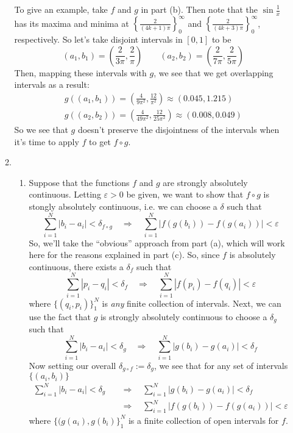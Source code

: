 \documentclass[12pt]{article}
\theoremstyle{plain}
\theoremstyle{definition}
\theoremstyle{remark}
\begin{document}
\begin{enumerate}
\begin{enumerate}
To give an example, take $f$ and $g$ in part (b). Then note that the $\sin\frac{1}{x}$ has its maxima and minima at $\left\{\frac{2}{(4k+1)\pi}\right\}_0^\infty$ and $\left\{\frac{2}{(4k+3)\pi}\right\}_0^\infty$, respectively. So let's take disjoint intervals in $[0,1]$ to be
\[
    (a_1,b_1) = \left(\frac{2}{3\pi}, \frac{2}{\pi}\right)
    \qquad
    (a_2,b_2) = \left(\frac{2}{7\pi}, \frac{2}{5\pi}\right)
\]
Then, mapping these intervals with $g$, we see that we get overlapping intervals as a result:
\begin{align*}
    g((a_1,b_1)) = \left(\frac{4}{9\pi^2}, \frac{12}{\pi^2}\right)
    \approx (0.045, 1.215)\\
    g((a_2,b_2)) = \left(\frac{4}{49\pi^2}, 
    \frac{12}{25\pi^2}\right)
    \approx (0.008, 0.049)
\end{align*}
So we see that $g$ doesn't preserve the disjointness of the intervals when it's time to apply $f$ to get $f\circ g$.


\item 
\begin{enumerate} 

\item Suppose that the functions $f$ and $g$ are strongly absolutely continuous. Letting $\varepsilon>0$ be given, we want to show that $f\circ g$ is stongly absolutely continuous, i.e. we can choose a $\delta$ such that 
\begin{equation}
    \sum_{i=1}^N |b_i-a_i|<\delta_{f\circ g}
    \quad\Rightarrow\quad
    \sum_{i=1}^N |f(g(b_i))-f(g(a_i))|<\varepsilon
\end{equation}
So, we'll take the ``obvious'' approach from part (a), which will work here for the reasons explained in part (c). So, since $f$ is absolutely continuous, there exists a $\delta_f$ such that
\begin{equation}
    \sum_{i=1}^N |p_i-q_i|<\delta_f
    \quad\Rightarrow\quad
    \sum_{i=1}^N |f(p_i)-f(q_i)|<\varepsilon
\end{equation}
where $\{(q_i,p_i)\}_1^N$ is \emph{any} finite collection of intervals. Next, we can use the fact that $g$ is strongly absolutely continuous to choose a $\delta_g$ such that
\begin{equation}
    \sum_{i=1}^N |b_i-a_i|<\delta_g
    \quad\Rightarrow\quad
    \sum_{i=1}^N |g(b_i)-g(a_i)|<\delta_f
\end{equation}
Now setting our overall $\delta_{g\circ f}:=\delta_g$, we see that for any set of intervals $\{(a_i, b_i)\}$
\begin{align*}
    \sum_{i=1}^N |b_i-a_i|<\delta_g
    &\quad\Rightarrow\quad
    \sum_{i=1}^N |g(b_i)-g(a_i)|<\delta_f \\
    &\quad\Rightarrow\quad
    \sum_{i=1}^N |f(g(b_i))-f(g(a_i))|<\varepsilon
\end{align*}
where $\{(g(a_i),g(b_i)\}^N_1$ is a finite collection of open intervals for $f$.


\end{enumerate}
\end{enumerate}
\end{enumerate}
\end{document}
